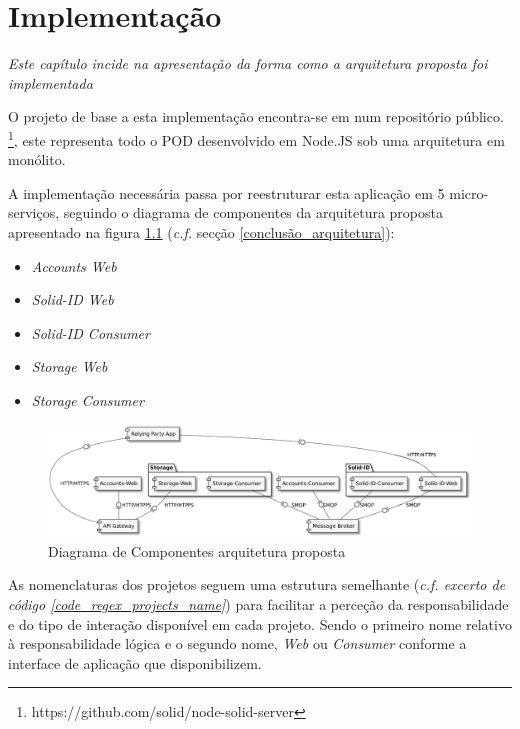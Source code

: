 
\chapter{Implementação}
\label{cap:5}
\emph{Este capítulo incide na apresentação da forma como a arquitetura proposta foi implementada}

O projeto de base a esta implementação encontra-se em num repositório público. \footnote{https://github.com/solid/node-solid-server}, este representa todo o POD desenvolvido em Node.JS sob uma arquitetura em monólito.

A implementação necessária passa por reestruturar esta aplicação em 5 micro-serviços, seguindo o diagrama de componentes da arquitetura proposta apresentado na figura \ref{implementacao_arquitetura_2_diagrama_componentes}  (\emph{c.f.} secção \ref{conclusão_arquitetura}):
\begin{itemize}
    \item \emph{Accounts Web}
    \item \emph{Solid-ID Web}
    \item \emph{Solid-ID Consumer}
    \item \emph{Storage Web}
    \item \emph{Storage Consumer}
\end{itemize}

\begin{figure}[H]
    \begin{center}
    \includegraphics[width=1 \textwidth]{figures/arquitetura_2_diagrama_componentes.eps}
    \caption{Diagrama de Componentes arquitetura proposta}
    \label{implementacao_arquitetura_2_diagrama_componentes}
    \end{center}
\end{figure}

As nomenclaturas dos projetos seguem uma estrutura semelhante (\emph{c.f. excerto de código \ref{code_regex_projects_name}}) para facilitar a perceção da responsabilidade e do tipo de interação disponível em cada projeto. Sendo o primeiro nome relativo à responsabilidade lógica e o segundo nome, \emph{Web} ou \emph{Consumer} conforme a interface de aplicação que disponibilizem.

